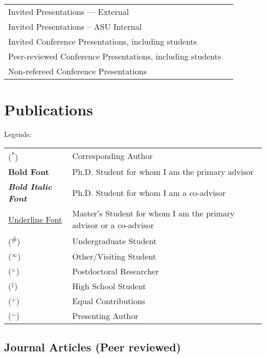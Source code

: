 \documentclass[letterpaper, 12pt]{extarticle}
\begin{document}
\begin{tabular}{p{}p{}}
Invited Presentations --- External    & \\
Invited Presentations -- ASU Internal & \\
Invited Conference Presentations, \newline
including students                    & \\
Peer-reviewed Conference Presentations, \newline
including students                    & \\
Non-refereed Conference Presentations & \\
\end{tabular}

\section{Publications}%
Legends:

\begin{tabular}{p{}p{}}
(\textsuperscript{*})                     & Corresponding Author \\
\textbf{Bold Font}                        & Ph.D. Student for whom I am the primary advisor  \\
\textbf{\textit{Bold Italic Font}}        & Ph.D. Student for whom I am a co-advisor  \\
\underline{Underline Font}                & Master's Student for whom I am the primary advisor
or a co-advisor                          \\
(\textsuperscript{\#})                    & Undergraduate Student \\
($^\infty$)                               & Other/Visiting Student \\
($^\times$)                               & Postdoctoral Researcher \\
($^\ddagger$)                             & High School Student \\
($^+$)                                    & Equal Contributions \\
($^\sim$)                                 & Presenting Author \\
\end{tabular}
\nocite{*}
\subsection{Journal Articles (Peer reviewed)}%
\printbibliography[heading=none, type=article]
\end{document}
